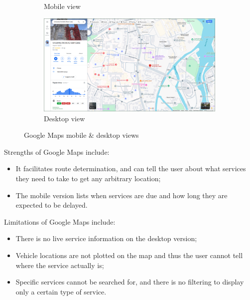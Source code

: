 \documentclass[a4paper,11pt]{report}
\begin{document}
\begin{figure}[H]
\begin{subfigure}[c]{0.2\textwidth}
        \caption{Mobile view}
    \end{subfigure}
    \hfill
    \begin{subfigure}[c]{0.79\textwidth}
        \centering
        \includegraphics[width=\textwidth]{../PDD/images/gdesk.png}
        \caption{Desktop view}
    \end{subfigure}
    \caption{Google Maps mobile \& desktop views}
\end{figure}

Strengths of Google Maps include:
\begin{itemize}
    \item   It facilitates route determination, and can tell the user about what services they need to take to get any arbitrary location;
    \item   The mobile version lists when services are due and how long they are expected to be delayed.
\end{itemize}

Limitations of Google Maps include:
\begin{itemize}
    \item   There is no live service information on the desktop version;
    \item   Vehicle locations are not plotted on the map and thus the user cannot tell where the service actually is;
    \item   Specific services cannot be searched for, and there is no filtering to display only a certain type of service.
\end{itemize}
\end{document}
